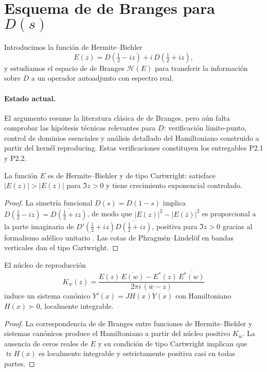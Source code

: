 \section{Esquema de de Branges para $D(s)$}

Introducimos la función de Hermite--Biehler
\[
  E(z)=D\!\left(\tfrac{1}{2}-iz\right)+i\,D\!\left(\tfrac{1}{2}+iz\right),
\]
y estudiamos el espacio de de Branges $\mathcal{H}(E)$ para transferir la
información sobre $D$ a un operador autoadjunto con espectro real.

\paragraph{Estado actual.}
El argumento resume la literatura clásica de de Branges, pero aún falta comprobar
las hipótesis técnicas relevantes para $D$: verificación límite-punto, control de
dominios esenciales y análisis detallado del Hamiltoniano construido a partir del
kernél reproducing.  Estas verificaciones constituyen los entregables P2.1 y
P2.2.

\begin{lemma}\label{lem:paper-HB}
La función $E$ es de Hermite--Biehler y de tipo Cartwright: satisface
$|E(z)|>|E(\overline{z})|$ para $\Im z>0$ y tiene crecimiento exponencial
controlado.
\end{lemma}

\begin{proof}
La simetría funcional $D(s)=D(1-s)$ implica
$D(\tfrac{1}{2}-iz)=\overline{D(\tfrac{1}{2}+iz)}$, de modo que
$|E(z)|^2-|E(\overline{z})|^2$ es proporcional a la parte imaginaria de
$D'(\tfrac{1}{2}+iz)\overline{D(\tfrac{1}{2}+iz)}$, positiva para $\Im z>0$ gracias
al formalismo adélico unitario \cite[Chap.~I]{Tate1967}.  Las cotas de
Phragm\'en--Lindel\"of en bandas verticales \cite[Prop.~3.1]{IK2004} dan el tipo
Cartwright.
\end{proof}

\begin{lemma}\label{lem:paper-H}
El núcleo de reproducción
\[
  K_w(z)=\frac{E(z)\,\overline{E(w)}-E^*(z)\,\overline{E^*(w)}}{2\pi i\,(\overline{w}-z)}
\]
induce un sistema canónico $Y'(x)=JH(x)Y(x)$ con Hamiltoniano $H(x)\succ0$,
localmente integrable.
\end{lemma}

\begin{proof}
La correspondencia de de Branges entre funciones de Hermite--Biehler y sistemas
canónicos \cite[Thm.~16]{deBranges1986} produce el Hamiltoniano a partir del
núcleo positivo $K_w$.  La ausencia de ceros reales de $E$ y su condición de tipo
Cartwright implican que $\operatorname{tr} H(x)$ es localmente integrable y
estrictamente positiva casi en todas partes.
\end{proof}


